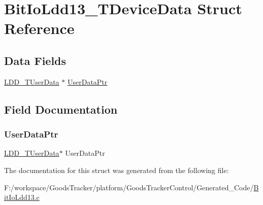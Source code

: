 \hypertarget{struct_bit_io_ldd13___t_device_data}{}\section{Bit\+Io\+Ldd13\+\_\+\+T\+Device\+Data Struct Reference}
\label{struct_bit_io_ldd13___t_device_data}
\subsection*{Data Fields}
\begin{DoxyCompactItemize}
\item 
\hyperlink{group___p_e___types__module_ga0b66a73f87238a782318aa0be7578e35}{L\+D\+D\+\_\+\+T\+User\+Data} $\ast$ \hyperlink{struct_bit_io_ldd13___t_device_data_a8e77b9d030b00c231823350a904e0f83}{User\+Data\+Ptr}
\end{DoxyCompactItemize}


\subsection{Field Documentation}
\mbox{\label{struct_bit_io_ldd13___t_device_data_a8e77b9d030b00c231823350a904e0f83}} 
\subsubsection{\texorpdfstring{User\+Data\+Ptr}{UserDataPtr}}
{\footnotesize\ttfamily \hyperlink{group___p_e___types__module_ga0b66a73f87238a782318aa0be7578e35}{L\+D\+D\+\_\+\+T\+User\+Data}$\ast$ User\+Data\+Ptr}



The documentation for this struct was generated from the following file\+:\begin{DoxyCompactItemize}
\item 
F\+:/workspace/\+Goods\+Tracker/platform/\+Goods\+Tracker\+Control/\+Generated\+\_\+\+Code/\hyperlink{_bit_io_ldd13_8c}{Bit\+Io\+Ldd13.\+c}\end{DoxyCompactItemize}
